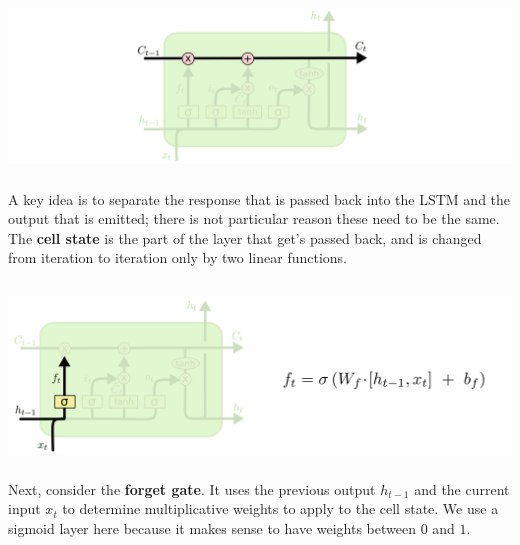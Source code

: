 \documentclass[xetex,mathserif,serif,aspectratio=169]{beamer}
\begin{document}
\begin{frame}[fragile] \frametitle{} \oldB \small

\begin{center}
\includegraphics[height=4.5cm]{img/cloah08.png}
\end{center}

A key idea is to separate the response that is passed back into
the LSTM and the output that is emitted; there is not particular
reason these need to be the same. The \textbf{cell state} is the
part of the layer that get's passed back, and is changed from
iteration to iteration only by two linear functions.

\end{frame}

\begin{frame}[fragile] \frametitle{} \oldB \small

\begin{center}
\includegraphics[height=4.5cm]{img/cloah09.png}
\end{center}

Next, consider the \textbf{forget gate}. It uses the previous
output $h_{t-1}$ and the current input $x_t$ to determine
multiplicative weights to apply to the cell state. We use a
sigmoid layer here because it makes sense to have weights
between $0$ and $1$.

\end{frame}
\end{document}
